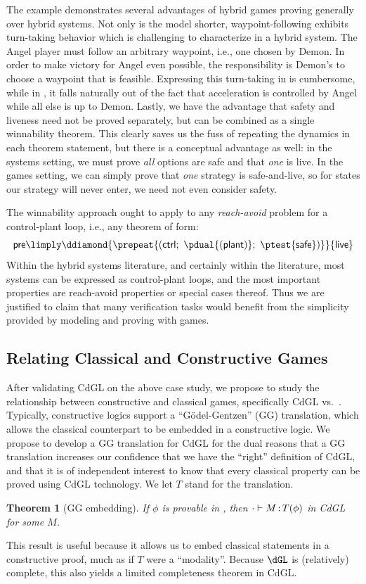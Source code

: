 \documentclass[12pt]{cmuthesis}
\newtheorem{theorem}{Theorem}
\theoremstyle{definition}
\theoremstyle{remark}
\newcommand{\ctrl}{\textsf{ctrl}\xspace}
\newcommand{\plant}{\textsf{plant}\xspace}
\newcommand{\rref}[2][]{\prettyref{#2}}
\newcommand{\CdGL}{\textsf{CdGL}\xspace}
\begin{document}
The example demonstrates several advantages of hybrid games proving generally over hybrid systems.
Not only is the model shorter, waypoint-following exhibits turn-taking behavior which is challenging to characterize in a hybrid system.
The Angel player must follow an arbitrary waypoint, i.e., one chosen by Demon.
In order to make victory for Angel even possible, the responsibility is Demon's to choose a waypoint that is feasible.
Expressing this turn-taking in \rref{thm:liveness} is cumbersome, while in \rref{thm:angel-wins-gen}, it falls naturally out of the fact that acceleration is controlled by Angel while all else is up to Demon.
Lastly, we have the advantage that safety and liveness need not be proved separately, but can be combined as a single winnability theorem.
This clearly saves us the fuss of repeating the dynamics in each theorem statement, but there is a conceptual advantage as well: in the systems setting, we must prove \emph{all} options are safe and that \emph{one} is live.
In the games setting, we can simply prove that \emph{one} strategy is safe-and-live, so for states our strategy will never enter, we need not even consider safety.

The winnability approach ought to apply to any \emph{reach-avoid} problem for a control-plant loop, i.e., any theorem of form:
\[\textsf{pre} \limply \ddiamond{\prepeat{(\ctrl;~\pdual{(\plant)};~\ptest{\textsf{safe}})}}{\textsf{live}}\]
Within the hybrid systems literature, and certainly within the \dL literature, most systems can be expressed as control-plant loops, and the most important properties are reach-avoid properties or special cases thereof.
Thus we are justified to claim that many verification tasks would benefit from the simplicity provided by modeling and proving with games.

\subsection{Relating Classical and Constructive Games}
After validating \CdGL on the above case study, we propose to study the relationship between constructive and classical games, specifically \CdGL vs.\ \dGL.
Typically, constructive logics support a ``G\"{o}del-Gentzen'' (GG) translation, which allows the classical counterpart to be embedded in a constructive logic.
We propose to develop a GG translation for \CdGL for the dual reasons that a GG translation increases our confidence that we have the ``right'' definition of \CdGL, and that it is of independent interest to know that every classical \dGL property can be proved using \CdGL technology.
We let $T$ stand for the translation.
\begin{theorem}[GG embedding]
  If $\phi$ is provable in \dGL, then $\cdot\allowbreak\vdash M \allowbreak \mathop{:} T(\phi)$ in \CdGL for some $M$.
\end{theorem}
This result is useful because it allows us to embed classical statements in a constructive proof, much as if $T$ were a ``modality''.
Because $\dGL$ is (relatively) complete, this also yields a limited completeness theorem in \CdGL.
\end{document}
